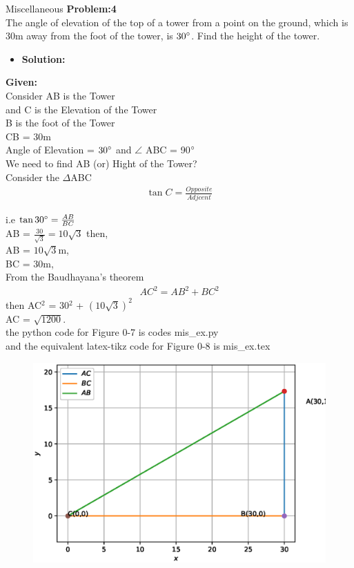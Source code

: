 \begin{frame}{Miscellaneous}
{\textbf{Problem:4}\\
The angle of elevation of the top of a tower from a point on the ground, which is 30m away from the foot of the tower, is $30\degree$. Find the height of the tower.}
\begin{itemize}
\item \textbf{Solution:}
\end{itemize}
\textbf{Given:}\\
Consider AB is the Tower\\
and C is the Elevation of the Tower \\
B is the foot of the Tower\\
CB = 30m\\
Angle of Elevation = $30\degree$ and $\angle$ ABC = 90$\degree$\\
We need to find AB (or) Hight of the Tower?\\
Consider the $\Delta$ABC \enspace 
\begin{align}
\tan C = \frac{Opposite}{Adjcent}
\end{align}
\end{frame}
\begin{frame}
i.e $\tan 30\degree = \frac{AB}{BC}$\\
AB = $\frac{30}{\sqrt{3}} = 10\sqrt{3}$
then,\\
AB = $10\sqrt{3}$m,\\
BC = 30m,\\
From the Baudhayana's theorem 
   \begin{align}
   AC^2 = AB^2 + BC^2 
   \end{align}
   then AC$^2$ = 30$^2$ + $(10\sqrt{3})^2$\\
   AC = $\sqrt{1200}.$\\
the python code for  Figure 0-7 is codes mis\_ex.py\\
and the equivalent latex-tikz code for Figure 0-8 is mis\_ex.tex
\end{frame}
\begin{frame}{}
\begin{figure}[!ht]
	\begin{center}
\includegraphics[width=0.8\columnwidth]{./figs/mis_ex.eps}
	\end{center}
	\caption{}
	\label{}	
\end{figure}
\end{frame}
